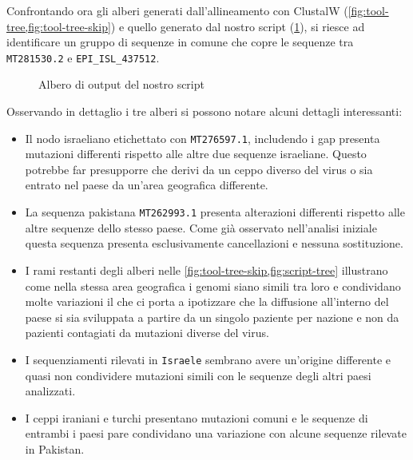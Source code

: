 \documentclass[11pt,italian]{article}
\begin{document}
\noindent
Confrontando ora gli alberi generati dall'allineamento con ClustalW (\cref{fig:tool-tree,fig:tool-tree-skip}) e quello generato dal nostro script (\cref{fig:script-tree}), si riesce ad identificare un gruppo di sequenze in comune che copre le sequenze tra \lstinline{MT281530.2} e \lstinline{EPI_ISL_437512}.

\begin{figure}[]
  \caption{Albero di output del nostro script}
  \label{fig:script-tree}
\end{figure}

\vspace{2mm}
\noindent
Osservando in dettaglio i tre alberi si possono notare alcuni dettagli interessanti:
\begin{itemize}
  \item Il nodo israeliano etichettato con \lstinline{MT276597.1}, includendo i gap presenta mutazioni differenti rispetto alle altre due sequenze israeliane. Questo potrebbe far presupporre che derivi da un ceppo diverso del virus o sia entrato nel paese da un'area geografica differente.
  \item La sequenza pakistana \lstinline{MT262993.1} presenta alterazioni differenti rispetto alle altre sequenze dello stesso paese. Come già osservato nell'analisi iniziale questa sequenza presenta esclusivamente cancellazioni e nessuna sostituzione.
  \item I rami restanti degli alberi nelle \cref{fig:tool-tree-skip,fig:script-tree} illustrano come nella stessa area geografica i genomi siano simili tra loro e condividano molte variazioni il che ci porta a ipotizzare che la diffusione all'interno del paese si sia sviluppata a partire da un singolo paziente per nazione e non da pazienti contagiati da mutazioni diverse del virus.
  \item I sequenziamenti rilevati in \lstinline{Israele} sembrano avere un'origine differente e quasi non condividere mutazioni simili con le sequenze degli altri paesi analizzati.
  \item I ceppi iraniani e turchi presentano mutazioni comuni e le sequenze di entrambi i paesi pare condividano una variazione con alcune sequenze rilevate in Pakistan.
\end{itemize}
\end{document}
